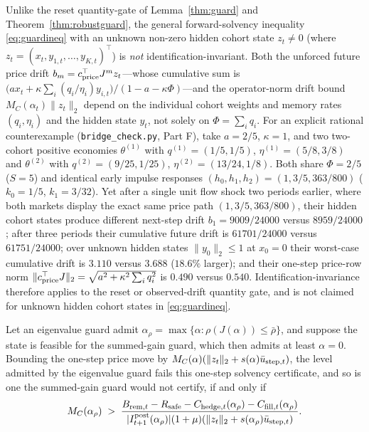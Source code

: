 Unlike the reset quantity-gate of Lemma~\ref{thm:guard} and Theorem~\ref{thm:robustguard}, the general forward-solvency inequality \eqref{eq:guardineq} with an unknown non-zero hidden cohort state $z_t\neq 0$ (where $z_t=(x_t,y_{1,t},\ldots,y_{K,t})^\top$) is \emph{not} identification-invariant. Both the unforced future price drift $b_m=c_{\rm price}^\top J^m z_t$---whose cumulative sum is $\bigl(a x_t+\kappa\sum_i(q_i/\eta_i)y_{i,t}\bigr)/(1-a-\kappa\Phi)$---and the operator-norm drift bound $M_C(\alpha_t)\|z_t\|_2$ depend on the individual cohort weights and memory rates $(q_i,\eta_i)$ and the hidden state $y_t$, not solely on $\Phi=\sum_i q_i$. For an explicit rational counterexample (\texttt{bridge\_check.py}, Part F), take $a=2/5$, $\kappa=1$, and two two-cohort positive economies $\theta^{(1)}$ with $q^{(1)}=(1/5,1/5)$, $\eta^{(1)}=(5/8,3/8)$ and $\theta^{(2)}$ with $q^{(2)}=(9/25,1/25)$, $\eta^{(2)}=(13/24,1/8)$. Both share $\Phi=2/5$ ($S=5$) and identical early impulse responses $(h_0,h_1,h_2)=(1,3/5,363/800)$ ($k_0=1/5$, $k_1=3/32$). Yet after a single unit flow shock two periods earlier, where both markets display the exact same price path $(1,3/5,363/800)$, their hidden cohort states produce different next-step drift $b_1=9009/24000$ versus $8959/24000$; after three periods their cumulative future drift is $61701/24000$ versus $61751/24000$; over unknown hidden states $\|y_0\|_2\le 1$ at $x_0=0$ their worst-case cumulative drift is $3.110$ versus $3.688$ ($18.6\%$ larger); and their one-step price-row norm $\|c_{\rm price}^\top J\|_2=\sqrt{a^2+\kappa^2\sum_i q_i^2}$ is $0.490$ versus $0.540$. Identification-invariance therefore applies to the reset or observed-drift quantity gate, and is not claimed for unknown hidden cohort states in \eqref{eq:guardineq}.

\begin{proposition}\label{prop:dominance}
Let an eigenvalue guard admit $\alpha_\rho=\max\{\alpha:\rho(J(\alpha))\le\bar\rho\}$, and suppose the state is feasible for the summed-gain guard, which then admits at least $\alpha=0$. Bounding the one-step price move by $M_C(\alpha)(\|z_t\|_2+s(\alpha)\bar u_{{\rm step},t})$, the level admitted by the eigenvalue guard fails this one-step solvency certificate, and so is one the summed-gain guard would not certify, if and only if
\[
M_C(\alpha_\rho)\;>\;\frac{B_{{\rm rem},t}-R_{\rm safe}-C_{{\rm hedge},t}(\alpha_\rho)-C_{{\rm fill},t}(\alpha_\rho)}{|I^{\rm post}_{t+1}(\alpha_\rho)|(1+\mu)(\|z_t\|_2+s(\alpha_\rho)\bar u_{{\rm step},t})} .
\]
\end{proposition}


